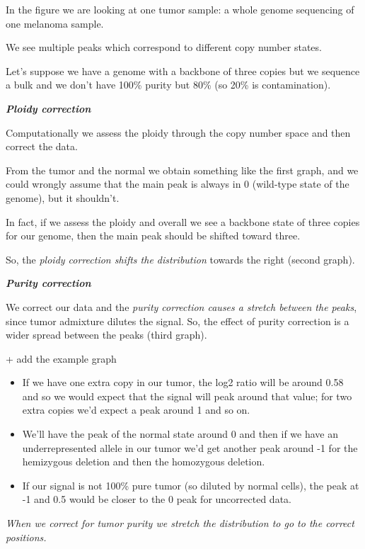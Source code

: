 In the figure we are looking at one tumor sample: a whole genome sequencing of
one melanoma sample.

We see multiple peaks which correspond to different copy number states.

Let's suppose we have a genome with a backbone of three copies but we sequence a
bulk and we don't have 100\% purity but 80\% (so 20\% is contamination).

\emph{\textbf{Ploidy correction}}

Computationally we assess the ploidy through the copy number space and then
correct the data.

From the tumor and the normal we obtain something like the first graph, and we
could wrongly assume that the main peak is always in 0 (wild-type state of the
genome), but it shouldn't.

In fact, if we assess the ploidy and overall we see a backbone state of three
copies for our genome, then the main peak should be shifted toward three.

So, the \emph{ploidy correction shifts the distribution} towards the right
(second graph).

\emph{\textbf{Purity correction}}

We correct our data and the \emph{{purity correction causes a stretch between
the peaks}}, since tumor admixture dilutes the signal. So, the effect of purity
correction is a wider spread between the peaks (third graph).

+ add the example graph

\begin{itemize}
\item
  If we have one extra copy in our tumor, the log2 ratio will be around 0.58 and
  so we would expect that the signal will peak around that value; for two extra
  copies we'd expect a peak around 1 and so on.
\item
  We'll have the peak of the normal state around 0 and then if we have an
  underrepresented allele in our tumor we'd get another peak around -1 for the
  hemizygous deletion and then the homozygous deletion.
\item
  If our signal is not 100\% pure tumor (so diluted by normal cells), the peak
  at -1 and 0.5 would be closer to the 0 peak for uncorrected data.
\end{itemize}

\emph{{When we correct for tumor purity we stretch the distribution to go to the
correct positions.}}

